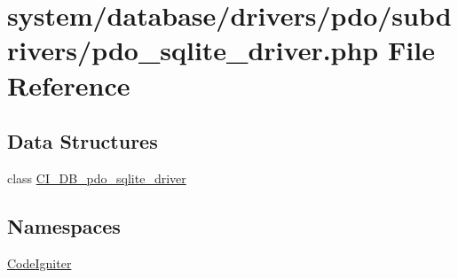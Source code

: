 \hypertarget{pdo__sqlite__driver_8php}{}\section{system/database/drivers/pdo/subdrivers/pdo\+\_\+sqlite\+\_\+driver.php File Reference}
\label{pdo__sqlite__driver_8php}
\subsection*{Data Structures}
\begin{DoxyCompactItemize}
\item 
class \mbox{\hyperlink{class_c_i___d_b__pdo__sqlite__driver}{C\+I\+\_\+\+D\+B\+\_\+pdo\+\_\+sqlite\+\_\+driver}}
\end{DoxyCompactItemize}
\subsection*{Namespaces}
\begin{DoxyCompactItemize}
\item 
 \mbox{\hyperlink{namespace_code_igniter}{Code\+Igniter}}
\end{DoxyCompactItemize}
